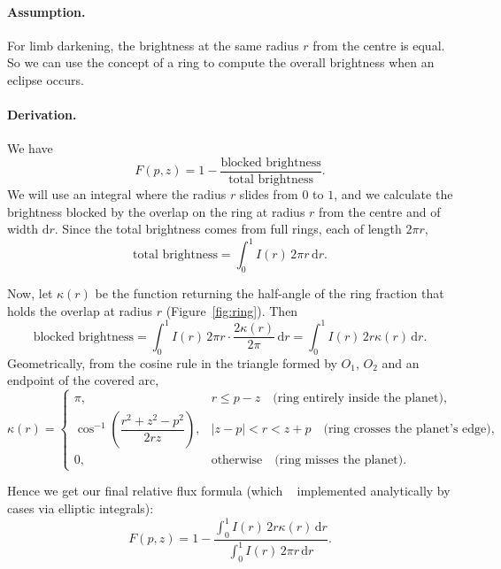 \documentclass[11pt,a4paper]{article}
\begin{document}
\paragraph{Assumption.}
For limb darkening, the brightness at the same radius $r$ from the centre is
equal. So we can use the concept of a ring to compute the overall brightness
when an eclipse occurs.

\paragraph{Derivation.}
We have
\begin{equation}
  F(p,z) = 1 - \frac{\text{blocked brightness}}{\text{total brightness}}.
\end{equation}
We will use an integral where the radius $r$ slides from $0$ to $1$, and we
calculate the brightness blocked by the overlap on the ring at radius $r$ from
the centre and of width $\mathrm{d}r$. Since the total brightness comes from
full rings, each of length $2\pi r$,
\begin{equation}
  \text{total brightness} = \int_0^1 I(r)\, 2\pi r \,\mathrm{d}r .
\end{equation}

Now, let $\kappa(r)$ be the function returning the half-angle of the ring
fraction that holds the overlap at radius $r$ (Figure~\ref{fig:ring}). Then
\begin{equation}
  \text{blocked brightness}
  = \int_0^1 I(r)\, 2\pi r \cdot \frac{2\kappa(r)}{2\pi} \,\mathrm{d}r
  = \int_0^1 I(r)\, 2 r \kappa(r) \,\mathrm{d}r .
\end{equation}
Geometrically, from the cosine rule in the triangle formed by $O_1$, $O_2$
and an endpoint of the covered arc,
\begin{equation}
  \kappa(r) =
  \begin{cases}
    \pi, & r \le p - z
      \quad\text{(ring entirely inside the planet)}, \\[4pt]
    \cos^{-1}\!\left(\dfrac{r^2 + z^2 - p^2}{2 r z}\right),
      & |z - p| < r < z + p
      \quad\text{(ring crosses the planet's edge)}, \\[10pt]
    0, & \text{otherwise}
      \quad\text{(ring misses the planet)}.
  \end{cases}
\end{equation}

Hence we get our final relative flux formula (which ~\cite{mandel2002} implemented analytically by cases via elliptic integrals):
\begin{equation}
  F(p,z) = 1 - \frac{\displaystyle\int_0^1 I(r)\, 2 r \kappa(r) \,\mathrm{d}r}
                    {\displaystyle\int_0^1 I(r)\, 2\pi r \,\mathrm{d}r}.
\end{equation}
\end{document}
